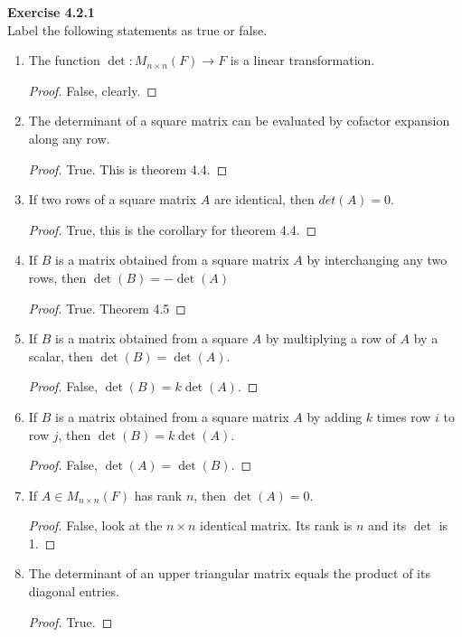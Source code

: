 \documentclass[12pt, a4paper]{article}
\theoremstyle{plain}
\newenvironment{exercise}[2][Exercise]
    { \begin{mdframed}[backgroundcolor=gray!20] \textbf{#1 #2} \\}
    {  \end{mdframed}}
\begin{document}
\begin{exercise}{4.2.1}
Label the following statements as true or false.
	\begin{enumerate}[label=(\alph*)]
	\item The function $\det:M_{n\times n}(F)\rightarrow F$ is a linear transformation.
		\begin{proof}
		False, clearly.
		\end{proof}
	\item The determinant of a square matrix can be evaluated by cofactor expansion along any row.
		\begin{proof}
		True. This is theorem 4.4.
		\end{proof}
	\item If two rows of a square matrix $A$ are identical, then $det(A)=0$.
		\begin{proof}
		True, this is the corollary for theorem 4.4.
		\end{proof}
	\item If $B$ is a matrix obtained from a square matrix $A$  by interchanging any two rows, then $\det(B)=-\det(A)$
		\begin{proof}
		True. Theorem 4.5
		\end{proof}
	\item If $B$ is a matrix obtained from a square $A$ by multiplying a row of $A$ by a scalar, then $\det(B)=\det(A)$.
		\begin{proof}
		False, $\det(B)=k\det(A)$.
		\end{proof}
	\item If $B$ is a matrix obtained from a square matrix $A$ by adding $k$ times row $i$ to row $j$, then $\det(B)=k\det(A)$.
		\begin{proof}
		False, $\det(A)=\det(B)$.
		\end{proof}
	\item If $A\in M_{n\times n}(F)$ has rank $n$, then $\det(A)=0$.
		\begin{proof}
		False, look at the $n\times n$ identical matrix. Its rank is $n$ and its $\det$ is 1.
		\end{proof}
	\item The determinant of an upper triangular matrix equals the product of its diagonal entries.
		\begin{proof}
		True. 
		\end{proof}
	\end{enumerate}
\end{exercise}

\pagebreak
\end{document}

